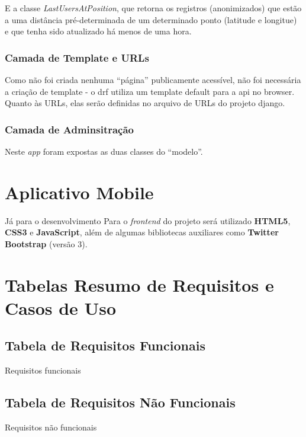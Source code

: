 E a classe \textit{LastUsersAtPosition}, que retorna os registros (anonimizados) que estão a uma distância pré-determinada de um determinado ponto (latitude e longitue) e que tenha sido atualizado há menos de uma hora.

\subsubsection{Camada de Template e URLs}
Como não foi criada nenhuma ``página'' publicamente acessível, não foi necessária a criação de template - o \gls{drf} utiliza um template default para a \gls{api} no browser. Quanto às URLs, elas serão definidas no arquivo de URLs do projeto \gls{django}.

\subsubsection{Camada de Adminsitração}
Neste \textit{app} foram expostas as duas classes do ``modelo''.


























\section{Aplicativo Mobile}\label{sec:spec-appmobile}

Já para o desenvolvimento Para o \textit{frontend} do projeto será utilizado \textbf{HTML5}, \textbf{CSS3} e \textbf{JavaScript}, além de algumas bibliotecas auxiliares como \textbf{Twitter Bootstrap} (versão 3).







\section{Tabelas Resumo de Requisitos e Casos de Uso}
\subsection{Tabela de Requisitos Funcionais}\label{subsec:tabResReqF}
   \begin{table}[H]
        \centering
        \caption{Requisitos funcionais}
        \label{tab:reqFunc}
        \PrintRequisitosFunc
    \end{table}
    

\subsection{Tabela de Requisitos Não Funcionais}\label{subsec:tabResReqNF}
   \begin{table}[H]
        \centering
        \caption{Requisitos não funcionais}
        \label{tab:reqNFunc}
        \PrintRequisitosNFunc
    \end{table}

